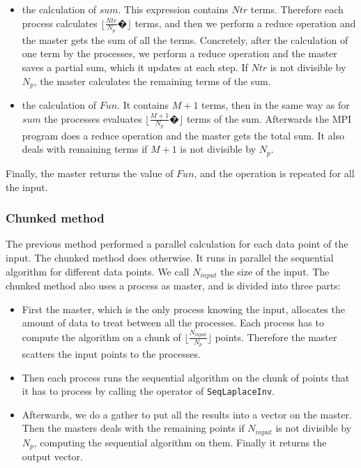 \documentclass[11pt,a4paper]{article}
\begin{document}
\begin{itemize}

\item the calculation of $sum$. This expression contains $Ntr$ terms. Therefore each process calculates $\lfloor \frac{Ntr}{N_p}�\rfloor$ terms, and then we perform a reduce operation and the master gets the sum of all the terms. Concretely, after the calculation of one term by the processes, we perform a reduce operation and the master saves a partial sum, which it updates at each step. If $Ntr$ is not divisible by $N_p$, the master calculates the remaining terms of the sum. 

\item the calculation of $Fun$. It contains $M+1$ terms, then in the same way as for $sum$ the processes evaluates $\lfloor \frac{M+1}{N_p}�\rfloor$ terms of the sum. Afterwards the MPI program does a reduce operation and the master gets the total sum. It also deals with remaining terms if $M+1$ is not divisible by $N_p$.

\end{itemize}

Finally, the master returns the value of $Fun$, and the operation is repeated for all the input. 

\subsubsection{Chunked method}
The previous method performed a parallel calculation for each data point of the input. The chunked method does otherwise. It runs in parallel the sequential algorithm for different data points. We call $N_{input}$ the size of the input. The chunked method also uses a process as master, and is divided into three parts: 

\begin{itemize}

\item First the master, which is the only process knowing the input, allocates the amount of data to treat between all the processes. Each process has to compute the algorithm on a chunk of $\lfloor \frac{N_{input}}{N_p} \rfloor$ points. Therefore the master scatters the input points to the processes. 

\item Then each process runs the sequential algorithm on the chunk of points that it has to process by calling the operator of \verb_SeqLaplaceInv_. 

\item Afterwards, we do a gather to put all the results into a vector on the master. Then the masters deals with the remaining points if $N_{input}$ is not divisible by $N_p$, computing the sequential algorithm on them. Finally it returns the output vector. 

\end{itemize}
\end{document}
